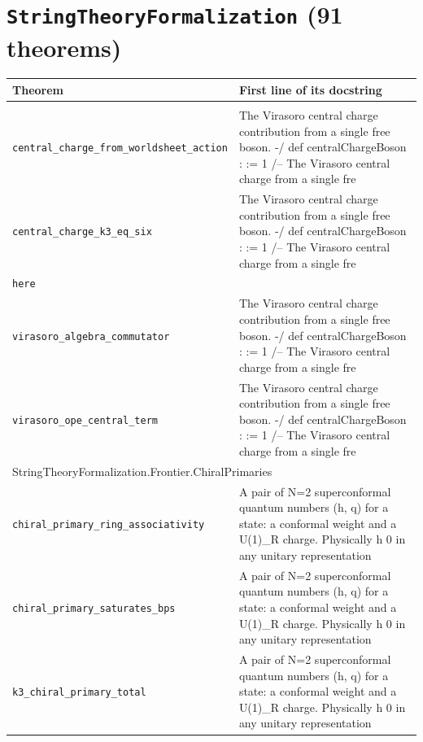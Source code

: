 \section*{\texttt{StringTheoryFormalization} (91 theorems)}
\begin{longtable}{p{}p{}}\toprule Theorem & First line of its docstring \\ \midrule\endhead\bottomrule\endfoot
\multicolumn{2}{l}{\textsf{\small StringTheoryFormalization.Frontier.CentralCharge}} \\
\quad\texttt{\footnotesize central\_charge\_from\_worldsheet\_action} & {\footnotesize The Virasoro central charge contribution from a single free boson. -/ def centralChargeBoson :  := 1 /-- The Virasoro central charge from a single fre} \\
\quad\texttt{\footnotesize central\_charge\_k3\_eq\_six} & {\footnotesize The Virasoro central charge contribution from a single free boson. -/ def centralChargeBoson :  := 1 /-- The Virasoro central charge from a single fre} \\
\quad\texttt{\footnotesize here} & {\footnotesize } \\
\quad\texttt{\footnotesize virasoro\_algebra\_commutator} & {\footnotesize The Virasoro central charge contribution from a single free boson. -/ def centralChargeBoson :  := 1 /-- The Virasoro central charge from a single fre} \\
\quad\texttt{\footnotesize virasoro\_ope\_central\_term} & {\footnotesize The Virasoro central charge contribution from a single free boson. -/ def centralChargeBoson :  := 1 /-- The Virasoro central charge from a single fre} \\
\multicolumn{2}{l}{\textsf{\small StringTheoryFormalization.Frontier.ChiralPrimaries}} \\
\quad\texttt{\footnotesize chiral\_primary\_ring\_associativity} & {\footnotesize A pair of N=2 superconformal quantum numbers (h, q) for a state: a conformal weight and a U(1)\_R charge. Physically h  0 in any unitary representation} \\
\quad\texttt{\footnotesize chiral\_primary\_saturates\_bps} & {\footnotesize A pair of N=2 superconformal quantum numbers (h, q) for a state: a conformal weight and a U(1)\_R charge. Physically h  0 in any unitary representation} \\
\quad\texttt{\footnotesize k3\_chiral\_primary\_total} & {\footnotesize A pair of N=2 superconformal quantum numbers (h, q) for a state: a conformal weight and a U(1)\_R charge. Physically h  0 in any unitary representation} \\

\end{longtable}
